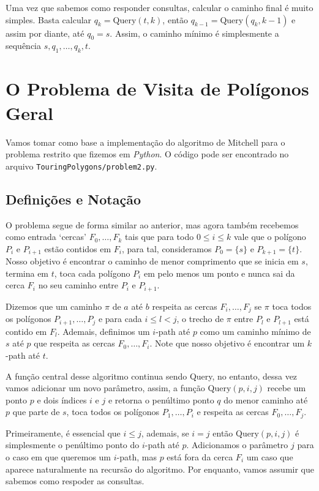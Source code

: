 \documentclass{article}
\begin{document}
Uma vez que sabemos como responder consultas, calcular o caminho final é muito simples. Basta calcular \(q_k = \text{Query}(t, k)\), então \(q_{k - 1} =\text{Query}(q_k, k - 1)\) e assim por diante, até \(q_0 = s\). Assim, o caminho mínimo é simplesmente a sequência \(s, q_1, \ldots, q_k, t\).

\section{O Problema de Visita de Polígonos Geral}

Vamos tomar como base a implementação do algoritmo de Mitchell para o problema restrito que fizemos em \textit{Python}. O código pode ser encontrado no arquivo \texttt{TouringPolygons/problem2.py}.

\subsection{Definições e Notação}

O problema segue de forma similar ao anterior, mas agora também recebemos como entrada `cercas' \(F_0, \dots, F_k\) tais que para todo \(0 \le i \le k\) vale que o polígono \(P_i\) e \(P_{i + 1}\) estão contidos em \(F_i\), para tal, consideramos \(P_0 = \{s\}\) e \(P_{k + 1} = \{t\}\). Nosso objetivo é encontrar o caminho de menor comprimento que se inicia em \(s\), termina em \(t\), toca cada polígono \(P_i\) em pelo menos um ponto e nunca sai da cerca \(F_i\) no seu caminho entre \(P_i\) e \(P_{i + 1}\).

Dizemos que um caminho \(\pi\) de \(a\) até \(b\) respeita as cercas \(F_i, \dots, F_j\) se \(\pi\) toca todos os polígonos \(P_{i + 1}, \dots, P_j\) e para cada \(i \le l < j\), o trecho de \(\pi\) entre \(P_l\) e \(P_{l + 1}\) está contido em \(F_l\). Ademais, definimos um \(i\)-path até \(p\) como um caminho mínimo de \(s\) até \(p\) que respeita as cercas \(F_0, \dots, F_i\). Note que nosso objetivo é encontrar um \(k\)-path até \(t\).

A função central desse algoritmo continua sendo Query, no entanto, dessa vez vamos adicionar um novo parâmetro, assim, a função \(\text{Query}(p, i, j)\) recebe um ponto \(p\) e dois índices \(i\) e \(j\) e retorna o penúltimo ponto \(q\) do menor caminho até \(p\) que parte de \(s\), toca todos os polígonos \(P_1, \dots, P_i\) e respeita as cercas \(F_0, \dots, F_j\).

Primeiramente, é essencial que \(i \le j\), ademais, se \(i = j\) então \(\text{Query}(p, i, j)\) é simplesmente o penúltimo ponto do \(i\)-path até \(p\). Adicionamos o parâmetro \(j\) para o caso em que queremos um \(i\)-path, mas \(p\) está fora da cerca \(F_i\) um caso que aparece naturalmente na recursão do algoritmo. Por enquanto, vamos assumir que sabemos como respoder as consultas.
\end{document}
